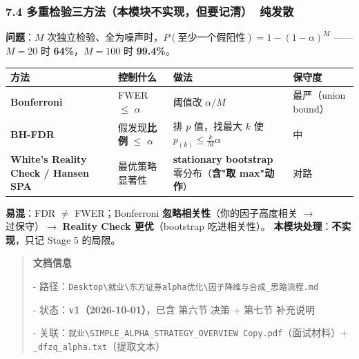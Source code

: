 \documentclass[11pt]{article}
\begin{document}
\subsubsection{\texorpdfstring{7.4 多重检验三方法（本模块不实现，但要记清）🔴 纯发散}{7.4 多重检验三方法（本模块不实现，但要记清）🔴 纯发散}}
\textbf{问题}：$M$ 次独立检验、全为噪声时，$P(\text{至少一个假阳性})=1-(1-\alpha)^M$ ------ $M=20$ 时 \textbf{64\%}，$M=100$ 时 \textbf{99.4\%}。
{\small
\begin{longtable}{p{4.77cm}p{2.39cm}p{6.66cm}p{2.39cm}}
\toprule
方法 & 控制什么 & 做法 & 保守度 \\
\midrule
\textbf{Bonferroni} & FWER \ensuremath{\le} \ensuremath{\alpha} & 阈值改 $\alpha/M$ & 最严（union bound） \\
\textbf{BH-FDR} & 假发现\textbf{比例} \ensuremath{\le} \ensuremath{\alpha} & 排 $p$ 值，找最大 $k$ 使 $p_{(k)}\le\frac{k}{M}\alpha$ & 中 \\
\textbf{White's Reality Check / Hansen SPA} & 最优策略显著性 & \textbf{stationary bootstrap} 零分布（\textbf{含"取 max"动作}） & 对路 \\
\bottomrule
\end{longtable}
}
\textbf{易混}：FDR \ensuremath{\ne} FWER；Bonferroni \textbf{忽略相关性}（你的因子高度相关 \ensuremath{\rightarrow} 过保守）\ensuremath{\rightarrow} \textbf{Reality Check 更优}（bootstrap 吃进相关性）。
\textbf{本模块处理}：\textbf{不实现}，只记 Stage 5 的局限。
\begin{quote}
\textbf{文档信息}

- 路径：\texttt{Desktop\textbackslash{}就业\textbackslash{}东方证券alpha优化\textbackslash{}因子降维与合成\_思路流程.md}

- 状态：\textbf{v1（2026-10-01）}，已含 第六节 决策 + 第七节 补充说明

- 关联：\texttt{就业\textbackslash{}SIMPLE\_ALPHA\_STRATEGY\_OVERVIEW Copy.pdf}（面试材料）+ \texttt{\_dfzq\_alpha.txt}（提取文本）
\end{quote}
\end{document}
